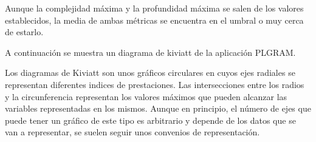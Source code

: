 Aunque la complejidad máxima y la profundidad máxima se salen de los valores establecidos, la media de ambas métricas se encuentra en el umbral o muy cerca de estarlo.

\newpage
A continuación se muestra un diagrama de kiviatt de la aplicación PLGRAM.

Los diagramas de Kiviatt son unos gráficos circulares en cuyos ejes radiales se representan diferentes indices de prestaciones. Las intersecciones entre los radios y la circunferencia representan los valores máximos que pueden alcanzar las variables representadas en los mismos. Aunque en principio, el número de ejes que puede tener un gráfico de este tipo es arbitrario y depende de los datos que se van a representar, se suelen seguir unos convenios de representación.
